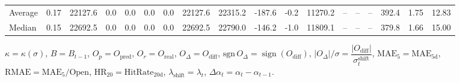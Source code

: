 \begin{threeparttable}
{\begin{tabular}{lrrrrrrrrrrrrrrrrr}
Average &     0.17 & 22127.6 &               0.0 &               0.0 &                0.0 &                0.0 & 22127.6 & 22315.2 &     -187.6 &                     -0.2 &             11270.2 &         -- &        -- &             -- &            392.4 &            1.75 &                  12.83 \\
 Median &     0.15 & 22692.5 &               0.0 &               0.0 &                0.0 &                0.0 & 22692.5 & 22790.0 &     -146.2 &                     -1.0 &             11809.1 &         -- &        -- &             -- &            379.8 &            1.66 &                  15.00 \\
\bottomrule
\end{tabular}
}
\begin{tablenotes}\footnotesize
\item $\kappa=\kappa(\sigma)$, $B=B_{t-1}$, $O_p=O_{\text{pred}}$, $O_r=O_{\text{real}}$, $O_\Delta=O_{\text{diff}}$, $\mathrm{sgn}\,O_\Delta=\operatorname{sign}(O_{\text{diff}})$, $|O_\Delta|/\sigma=\dfrac{|O_{\text{diff}}|}{\sigma_t^{\text{shift}}}$, $\mathrm{MAE}_5=\mathrm{MAE}_{5\text{d}}$, $\mathrm{RMAE}= \mathrm{MAE}_5 / \text{Open}$, $\mathrm{HR}_{20}=\mathrm{HitRate}_{20\text{d}}$, 
$\lambda_{\text{shift}}=\lambda_t$, 
$\Delta\alpha_t=\alpha_t-\alpha_{t-1}$.
\end{tablenotes}
\end{threeparttable}
\endgroup

